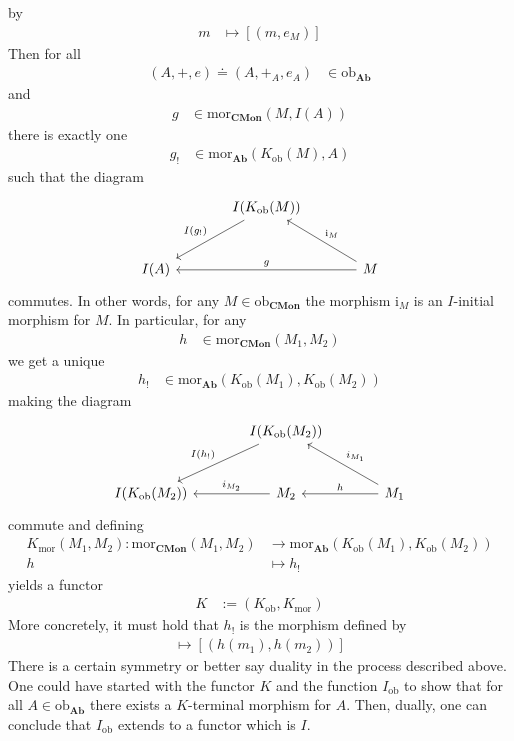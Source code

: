 \begin{exa}
by
\begin{align*}
  m
  &\mapsto
  [(m,e_{M})]
\end{align*}
Then for all
\begin{align*}
  (A,+,e)
  \doteq
  (A,+_{A},e_{A})
  &\in
  \mathrm{ob}_{\mathbf{Ab}}
\end{align*}
and
\begin{align*}
  g
  &\in
  \mathrm{mor}_{\mathbf{CMon}}(M,I(A))
\end{align*}
there is exactly one
\begin{align*}
  g_{!}
  &\in
  \mathrm{mor}_{\mathbf{Ab}}(K_{\textrm{ob}}(M),A)
\end{align*}
such that the diagram
\[
\begin{tikzcd}[sep=large]
  &
  I(K_{\textrm{ob}}(M))
  \arrow[swap]{dl}{I(g_{!})}
  &
  \\
  I(A)
  &
  &
  M
  \arrow[swap]{ll}{g}
  \arrow[swap]{ul}{\mathrm{i}_{M}}
\end{tikzcd}
\]
commutes. In other words, for any $M \in \mathrm{ob}_{\mathbf{CMon}}$ the morphism $\mathrm{i}_{M}$ is an $I$-initial morphism for $M$. In particular, for any
\begin{align*}
  h
  &\in
  \mathrm{mor}_{\mathbf{CMon}}(M_{1},M_{2})
\end{align*}
we get a unique
\begin{align*}
  h_{!}
  &\in
  \mathrm{mor}_{\mathbf{Ab}}
  \left(
    K_{\textrm{ob}}(M_{1}),
    K_{\textrm{ob}}(M_{2})
  \right)
\end{align*}
making the diagram
\[
\begin{tikzcd}[sep=large]
  &
  I(K_{\textrm{ob}}(M_{2}))
  \arrow[swap]{dl}{I(h_{!})}  
  &
  \\
  I(K_{\textrm{ob}}(M_{2}))
  &
  M_{2}
  \arrow[swap]{l}{i_{M_{2}}}
  &
  M_{1}
  \arrow[swap]{l}{h}
  \arrow[swap]{ul}{i_{M_{1}}}
\end{tikzcd}
\]
commute and defining
\begin{align*}
  K_{\mathrm{mor}}(M_{1},M_{2})
  \colon
  \mathrm{mor}_{\mathbf{CMon}}(M_{1},M_{2})
  &\rightarrow
  \mathrm{mor}_{\mathbf{Ab}}(K_{\mathrm{ob}}(M_{1}),K_{\mathrm{ob}}(M_{2}))
  \\
  h
  &\mapsto
  h_{!}
\end{align*}
yields a functor
\begin{align*}
  K
  &:=
  (K_{\mathrm{ob}},K_{\mathrm{mor}})
\end{align*}
More concretely, it must hold that $h_{!}$ is the morphism defined by
\begin{align*}
  [(m_{1},m_{2})]
  \mapsto
  [(h(m_{1}),h(m_{2}))]
\end{align*}
There is a certain symmetry or better say duality in the process described above. One could have started with the functor $K$ and the function $I_{\mathrm{ob}}$ to show that for all $A \in \mathrm{ob}_{\mathbf{Ab}}$ there exists a $K$-terminal morphism for $A$. Then, dually, one can conclude that $I_{\mathrm{ob}}$ extends to a functor which is $I$.
\end{exa}
